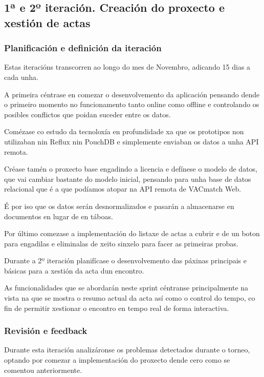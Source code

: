     \subsection{1ª e 2º iteración. Creación do proxecto e xestión de actas}

      \subsubsection{Planificación e definición da iteración}
      Estas iteracións transcorren ao longo do mes de Novembro, adicando 15 
dias a cada unha.

      A primeira céntrase en comezar o desenvolvemento da 
aplicación pensando dende o primeiro momento no funcionamento tanto online 
como offline e controlando os posibles conflictos que poidan suceder entre os 
datos.

      Comézase co estudo da tecnoloxía en profundidade xa que os 
prototipos non utilizaban nin Reflux nin PouchDB e simplemente enviaban os 
datos a unha API remota.

      Créase tamén o proxecto base engadindo a licencia e defínese o modelo de 
datos, que vai cambiar bastante do modelo inicial, pensando para unha base de 
datos relacional que é a que podíamos atopar na API remota de VACmatch Web.

      É por iso que os datos serán desnormalizados e pasarán a almacenarse en 
documentos en lugar de en táboas.

      Por último comezase a implementación do listaxe de actas a cubrir e de un 
boton para engadilas e eliminalas de xeito sinxelo para facer as primeiras 
probas.

        Durante a 2º iteración planifícase o desenvolvemento das páxinas 
principais e básicas para a xestión da acta dun encontro.

      As funcionalidades que se abordarán neste sprint céntranse principalmente 
na vista na que se mostra o resumo actual da acta así como o control do tempo, 
co fin de permitir xestionar o encontro en tempo real de forma interactiva.

      \subsubsection{Revisión e feedback}
      Durante esta iteración analizáronse os problemas detectados durante o 
torneo, optando por comezar a implementación do proxecto dende cero como se 
comentou anteriormente.

